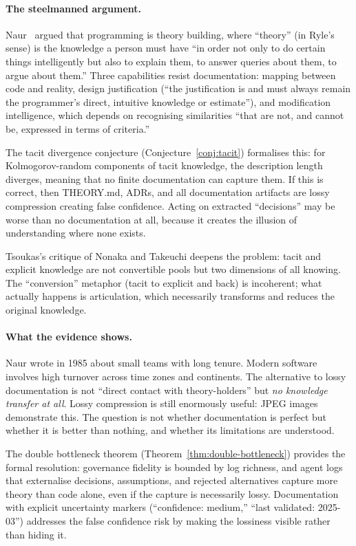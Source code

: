 \documentclass[11pt, a4paper, logo, copyright]{googledeepmind}
\begin{document}
\paragraph{The steelmanned argument.}
Naur~\citep{naur1985} argued that programming is theory building, where ``theory'' (in Ryle's sense) is the knowledge a person must have ``in order not only to do certain things intelligently but also to explain them, to answer queries about them, to argue about them.'' Three capabilities resist documentation: mapping between code and reality, design justification (``the justification is and must always remain the programmer's direct, intuitive knowledge or estimate''), and modification intelligence, which depends on recognising similarities ``that are not, and cannot be, expressed in terms of criteria.''

The tacit divergence conjecture (Conjecture~\ref{conj:tacit}) formalises this: for Kolmogorov-random components of tacit knowledge, the description length diverges, meaning that no finite documentation can capture them. If this is correct, then THEORY.md, ADRs, and all documentation artifacts are lossy compression creating false confidence. Acting on extracted ``decisions'' may be worse than no documentation at all, because it creates the illusion of understanding where none exists.

Tsoukas's critique of Nonaka and Takeuchi deepens the problem: tacit and explicit knowledge are not convertible pools but two dimensions of all knowing. The ``conversion'' metaphor (tacit to explicit and back) is incoherent; what actually happens is articulation, which necessarily transforms and reduces the original knowledge.

\paragraph{What the evidence shows.}
Naur wrote in 1985 about small teams with long tenure. Modern software involves high turnover across time zones and continents. The alternative to lossy documentation is not ``direct contact with theory-holders'' but \emph{no knowledge transfer at all}. Lossy compression is still enormously useful: JPEG images demonstrate this. The question is not whether documentation is perfect but whether it is better than nothing, and whether its limitations are understood.

The double bottleneck theorem (Theorem~\ref{thm:double-bottleneck}) provides the formal resolution: governance fidelity is bounded by log richness, and agent logs that externalise decisions, assumptions, and rejected alternatives capture more theory than code alone, even if the capture is necessarily lossy. Documentation with explicit uncertainty markers (``confidence: medium,'' ``last validated: 2025-03'') addresses the false confidence risk by making the lossiness visible rather than hiding it.
\end{document}
